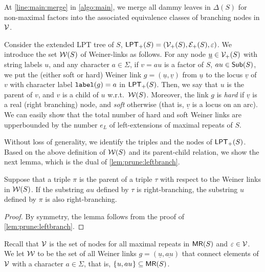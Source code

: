 \documentclass{article}
\begin{document}
At \cref{line:main:merge} in \cref{algo:main}, we merge all dammy leaves in $\Delta(S)$ for non-maximal factors into the associated equivalence classes of branching nodes in $\sig V$.

Consider the extended LPT tree of $S$, $\LPT[+](S) = (\sig V_+(S), \sig E_+(S), \eps)$. We introduce the set $\sig W(S)$ of Weiner-links as follows. 
For any node $\underline u \in \sig V_+(S)$ with string labels $u$, and any character $a \in \Sigma$, if $v = au$ is a factor of $S$, $au \in \Sub(S)$, we put the (either soft or hard) Weiner link $g = (\underline u, \underline v)$ from $\underline u$ to the locus $\underline v$ of $v$ with character label $\lab(g) = a$ in $\LPT[+](S)$. Then, we say that $u$ is the parent of $v$, and $v$ is a child of $u$ w.r.t.~$\sig W(S)$. 
Moreover, the link $g$ is \textit{hard} if $\underline v$ is a real (right branching) node, and \textit{soft} otherwise (that is, $\underline v$ is a locus on an arc).
We can easily show that the total number of hard and soft Weiner links are upperbounded by the number $e_L$ of left-extensions of maximal repeats of $S$. 

Without loss of generality, we identify the triples and the nodes of $\LPT[+](S)$. Based on the above definition of $\sig W(S)$ and its parent-child relation, we show the next lemma, which is the dual of \cref{lem:prune:leftbranch}. 

\begin{lemma}\label{lem:prune:rightbranch}
Suppose that a triple $\pi$ is the parent of a triple $\tau$ with respect to the Weiner links in $\sig W(S)$. If the substring $au$ defined by $\tau$ is right-branching, the substring $u$ defined by $\pi$ is also right-branching. 
\end{lemma}

\begin{proof}
  By symmetry, the lemma follows from the proof of \cref{lem:prune:leftbranch}. 
\end{proof}

Recall that $\sig V$ is the set of nodes for all maximal repeats in $\MR(S)$ and $\eps \in \sig V$. 
We let $\sig W$ to be the set of all Weiner links $g = (\underline u, \underline{au})$ that connect elements of $\sig V$ with a character $a \in \Sigma$, that is, $\set{u, au} \subseteq \MR(S)$.
\end{document}
